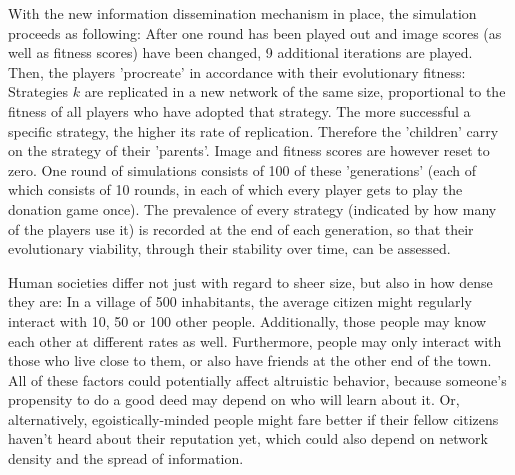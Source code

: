 \documentclass{JASSS}
\begin{document}
With the new information dissemination mechanism in place, the simulation proceeds as following: After one round has been played out and image scores (as well as fitness scores) have been changed, 9 additional iterations are played. Then, the players 'procreate' in accordance with their evolutionary fitness: Strategies $k$ are replicated in a new network of the same size, proportional to the fitness of all players who have adopted that strategy. The more successful a specific strategy, the higher its rate of replication. Therefore the 'children' carry on the strategy of their 'parents'. Image and fitness scores are however reset to zero. One round of simulations consists of 100 of these 'generations' (each of which consists of 10 rounds, in each of which every player gets to play the donation game once). The prevalence of every strategy (indicated by how many of the players use it) is recorded at the end of each generation, so that their evolutionary viability, through their stability over time, can be assessed.

Human societies differ not just with regard to sheer size, but also in how dense they are: In a village of 500 inhabitants, the average citizen might regularly interact with 10, 50 or 100 other people. Additionally, those people may know each other at different rates as well. Furthermore, people may only interact with those who live close to them, or also have friends at the other end of the town. All of these factors could potentially affect altruistic behavior, because someone's propensity to do a good deed may depend on who will learn about it. Or, alternatively, egoistically-minded people might fare better if their fellow citizens haven't heard about their reputation yet, which could also depend on network density and the spread of information.
\end{document}
